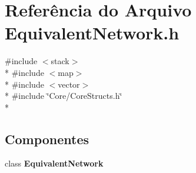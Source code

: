 \section{Referência do Arquivo Equivalent\+Network.\+h}
\label{_equivalent_network_8h}
{\ttfamily \#include $<$stack$>$}\\*
{\ttfamily \#include $<$map$>$}\\*
{\ttfamily \#include $<$vector$>$}\\*
{\ttfamily \#include \char`\"{}Core/\+Core\+Structs.\+h\char`\"{}}\\*
\subsection*{Componentes}
\begin{DoxyCompactItemize}
\item 
class {\bf Equivalent\+Network}
\end{DoxyCompactItemize}
